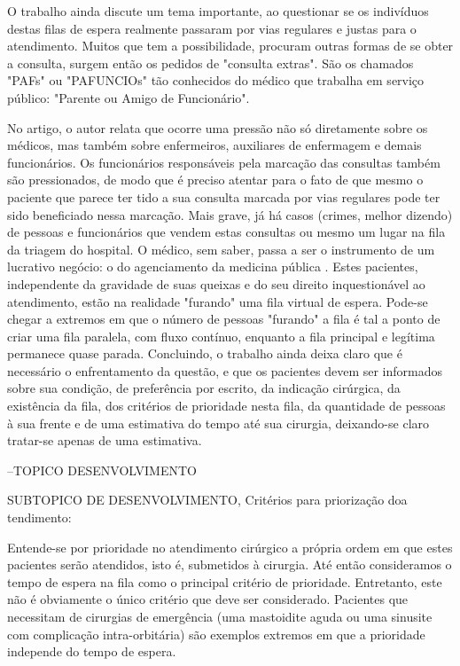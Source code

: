     O trabalho ainda discute um tema importante, ao questionar se os indivíduos destas filas de espera realmente passaram por vias regulares e justas para o atendimento. Muitos que tem a possibilidade, procuram outras formas de se obter a consulta, surgem então os pedidos de "consulta extras". São os chamados "PAFs" ou "PAFUNCIOs" tão conhecidos do médico que trabalha em serviço público: "Parente ou Amigo de Funcionário".

    No artigo, o autor relata que ocorre uma pressão não só diretamente sobre os médicos, mas também sobre enfermeiros, auxiliares de enfermagem e demais funcionários. Os funcionários responsáveis pela marcação das consultas também são pressionados, de modo que é preciso atentar para o fato de que mesmo o paciente que parece ter tido a sua consulta marcada por vias regulares pode ter sido beneficiado nessa marcação. Mais grave, já há casos (crimes, melhor dizendo) de pessoas e funcionários que vendem estas consultas ou mesmo um lugar na fila da triagem do hospital. O médico, sem saber, passa a ser o instrumento de um lucrativo negócio: o do agenciamento da medicina pública .
    Estes pacientes, independente da gravidade de suas queixas e do seu direito inquestionável ao atendimento, estão na realidade "furando" uma fila virtual de espera. Pode-se chegar a extremos em que o número de pessoas "furando" a fila é tal a ponto de criar uma fila paralela, com fluxo contínuo, enquanto a fila principal e legítima permanece quase parada. Concluindo, o trabalho ainda deixa claro que é necessário o enfrentamento da questão, e que os pacientes devem ser informados sobre sua condição, de preferência por escrito, da indicação cirúrgica, da existência da fila, dos critérios de prioridade nesta fila, da quantidade de pessoas à sua frente e de uma estimativa do tempo até sua cirurgia, deixando-se claro tratar-se apenas de uma estimativa.
    
    --TOPICO DESENVOLVIMENTO
    
    SUBTOPICO DE DESENVOLVIMENTO, Critérios para priorização doa tendimento:
    
    Entende-se por prioridade no atendimento cirúrgico a própria ordem em que estes pacientes serão atendidos, isto é, submetidos à cirurgia. Até então consideramos o tempo de espera na fila como o principal critério de prioridade. Entretanto, este não é obviamente o único critério que deve ser considerado. Pacientes que necessitam de cirurgias de emergência (uma mastoidite aguda ou uma sinusite com complicação intra-orbitária) são exemplos extremos em que a prioridade independe do tempo de espera.

